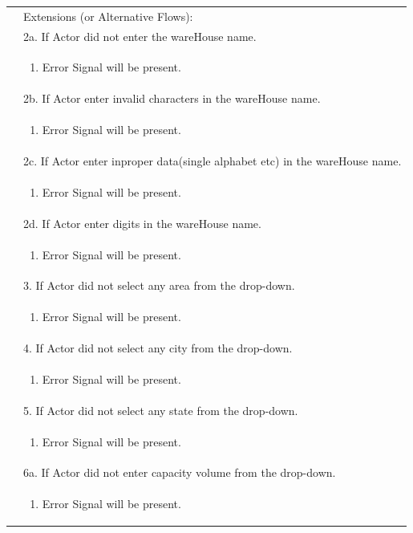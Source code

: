 \documentclass[12pt,a4paper]{article}
\begin{document}
\begin{longtable}{| p{3cm}|p{12cm}|}
&Extensions (or Alternative Flows):\\
& 2a. If Actor did not enter the wareHouse name. \\
& \begin{enumerate}
		\item Error Signal will be present.
	\end{enumerate}
\\ 
& 2b. If Actor enter invalid characters in the wareHouse name. \\
& \begin{enumerate}
		\item Error Signal will be present.
	\end{enumerate}\\
& 2c. If Actor enter inproper data(single alphabet etc) in the wareHouse name. \\
& \begin{enumerate}
		\item Error Signal will be present.
	\end{enumerate}
\\ 
& 2d. If Actor enter digits in the wareHouse name. \\
& \begin{enumerate}
		\item Error Signal will be present.
	\end{enumerate}
\\ 

& 3. If Actor did not select any area from the drop-down. \\
& \begin{enumerate}
		\item Error Signal will be present.
	\end{enumerate}
\\ 

&  4. If Actor did not select any city from the drop-down. \\
& \begin{enumerate}
		\item Error Signal will be present.
	\end{enumerate}
\\ 
&  5. If Actor did not select any state from the drop-down. \\
& \begin{enumerate}
		\item Error Signal will be present.
	\end{enumerate}
\\
&  6a. If Actor did not enter capacity volume  from the drop-down. \\
& \begin{enumerate}
		\item Error Signal will be present.
	\end{enumerate}
\\


\end{longtable}
\end{document}
